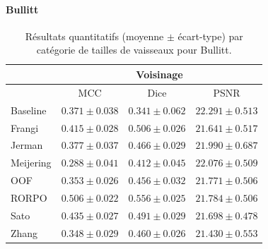 \paragraph{Bullitt}

\begin{table}[H]
  \begin{center}
  \label{tab:Vessels size Bullitt}
  \caption{Résultats quantitatifs (moyenne $\pm$ écart-type) par catégorie de tailles de vaisseaux pour Bullitt.}
  
  \begin{tabular}{lccc}
            \hline
            & \multicolumn{3}{c}{Voisinage}                  \\
            \hline
            & MCC & Dice & PSNR  \\
            Baseline	    & $ 0.371 \pm 0.038 $ & $ 0.341 \pm 0.062 $ & $ 22.291 \pm	0.513 $ \\
            Frangi	    & $ 0.415 \pm 0.028 $ & $ 0.506 \pm 0.026 $ & $ 21.641 \pm	0.517 $ \\
            Jerman	    & $ 0.377 \pm 0.037 $ & $ 0.466 \pm 0.029 $ & $ 21.990 \pm	0.687 $ \\
            Meijering	    & $ 0.288 \pm 0.041 $ & $ 0.412 \pm 0.045 $ & $ 22.076 \pm	0.509 $ \\ 
            OOF	        & $ 0.353 \pm 0.026 $ & $ 0.456 \pm 0.032 $ & $ 21.771 \pm	0.506 $ \\
            RORPO	        & $ 0.506 \pm 0.022 $ & $ 0.556 \pm 0.025 $ & $ 21.784 \pm	0.506 $ \\
            Sato	        & $ 0.435 \pm 0.027 $ & $ 0.491 \pm 0.029 $ & $ 21.698 \pm	0.478 $ \\
            Zhang	        & $ 0.348 \pm 0.029 $ & $ 0.460 \pm 0.026 $ & $ 21.430 \pm	0.553 $ \\
      

\end{tabular}
\end{center}
\end{table}
